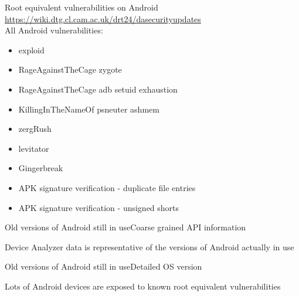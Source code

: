 \documentclass{beamer}
\begin{document}
\begin{frame}{Root equivalent vulnerabilities on Android}{}
\small \url{https://wiki.dtg.cl.cam.ac.uk/drt24/dasecurityupdates}\\
All Android vulnerabilities:
 \begin{itemize}
  \item exploid
  \item RageAgainstTheCage zygote
  \item RageAgainstTheCage adb setuid exhaustion
  \item KillingInTheNameOf psneuter ashmem
  \item zergRush
  \item levitator
  \item Gingerbreak
  \item APK signature verification - duplicate file entries
  \item APK signature verification - unsigned shorts
 \end{itemize}

\end{frame}

\begin{frame}{Old versions of Android still in use}{Coarse grained API information}
 \begin{center}
 \end{center}
Device Analyzer data is representative of the versions of Android actually in use
\end{frame}

\begin{frame}{Old versions of Android still in use}{Detailed OS version}
 \begin{center}
  \vspace{-0.5em}
 \end{center}
\end{frame}

\begin{frame}{Lots of Android devices are exposed to known root equivalent vulnerabilities}{}
 \begin{center}
  \vspace{-0.5em}
 \end{center}
\end{frame}
\end{document}
